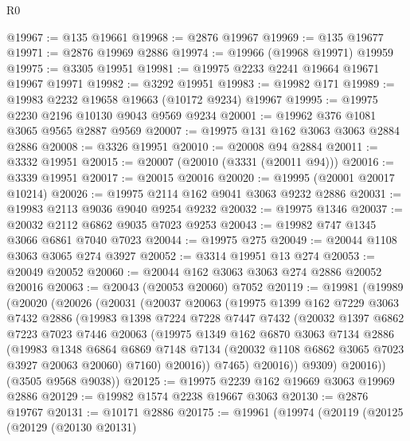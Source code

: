 \begin{lexlean}{R0}
\begin{coremodule}
@19967 := @135 @19661
@19968 := @2876 @19967
@19969 := @135 @19677
@19971 := @2876 @19969 @2886
@19974 := @19966 (@19968 @19971) @19959
@19975 := @3305 @19951
@19981 := @19975 @2233 @2241 @19664 @19671 @19967 @19971
@19982 := @3292 @19951
@19983 := @19982 @171
@19989 := @19983 @2232 @19658 @19663 (@10172 @9234) @19967
@19995 := @19975 @2230 @2196 @10130 @9043 @9569 @9234
@20001 := @19962 @376 @1081 @3065 @9565 @2887 @9569
@20007 := @19975 @131 @162 @3063 @3063 @2884 @2886
@20008 := @3326 @19951
@20010 := @20008 @94 @2884
@20011 := @3332 @19951
@20015 := @20007 (@20010 (@3331 (@20011 @94)))
@20016 := @3339 @19951
@20017 := @20015 @20016
@20020 := @19995 (@20001 @20017 @10214)
@20026 := @19975 @2114 @162 @9041 @3063 @9232 @2886
@20031 := @19983 @2113 @9036 @9040 @9254 @9232
@20032 := @19975 @1346
@20037 := @20032 @2112 @6862 @9035 @7023 @9253
@20043 := @19982 @747 @1345 @3066 @6861 @7040 @7023
@20044 := @19975 @275
@20049 := @20044 @1108 @3063 @3065 @274 @3927
@20052 := @3314 @19951 @13 @274
@20053 := @20049 @20052
@20060 := @20044 @162 @3063 @3063 @274 @2886 @20052 @20016
@20063 := @20043 (@20053 @20060) @7052
@20119 := @19981
    (@19989
      (@20020
        (@20026
          (@20031
            (@20037
              @20063
              (@19975
                @1399
                @162
                @7229
                @3063
                @7432
                @2886
                (@19983
                  @1398
                  @7224
                  @7228
                  @7447
                  @7432
                  (@20032
                    @1397
                    @6862
                    @7223
                    @7023
                    @7446
                    @20063
                    (@19975
                      @1349
                      @162
                      @6870
                      @3063
                      @7134
                      @2886
                      (@19983
                        @1348
                        @6864
                        @6869
                        @7148
                        @7134
                        (@20032 @1108 @6862 @3065 @7023 @3927 @20063 @20060)
                        @7160)
                      @20016))
                  @7465)
                @20016))
            @9309)
          @20016))
      (@3505 @9568 @9038))
@20125 := @19975 @2239 @162 @19669 @3063 @19969 @2886
@20129 := @19982 @1574 @2238 @19667 @3063
@20130 := @2876 @19767
@20131 := @10171 @2886
@20175 := @19961
    (@19974
      (@20119
        (@20125
          (@20129
            (@20130 @20131)

\end{coremodule}
\end{lexlean}
